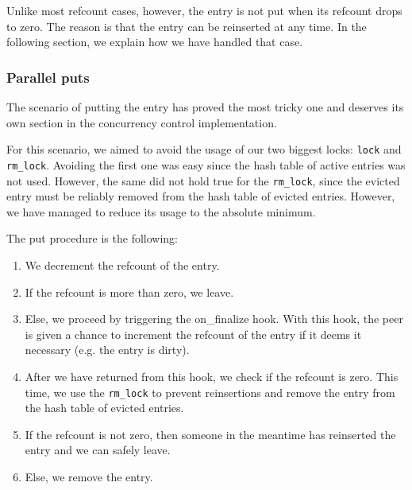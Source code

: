 \begin{comment}
\begin{table}
	\centering
	\begin{tabular}{ | l | l | }
		\hline
		Case & Refcount \\ \hline \hline
		active entry with pending jobs & ref > 1 \\ \hline
		active entry with no pending jobs & ref = 1 \\ \hline
		evicted entry with pending jobs & ref > 0 \\ \hline
		evicted entry with no pending jobs & ref = 0 \\ \hline
	\end{tabular}
	\caption{Reference counting of xcache}
	\label{tab:refcount}
\end{table}
\end{comment}

Unlike most refcount cases, however, the entry is not put when its refcount 
drops to zero. The reason is that the entry can be reinserted at any time. In 
the following section, we explain how we have handled that case.

\subsubsection{Parallel puts}

The scenario of putting the entry has proved the most tricky one and deserves 
its own section in the concurrency control implementation.

For this scenario, we aimed to avoid the usage of our two biggest locks: 
\texttt{lock} and \texttt{rm\_lock}. Avoiding the first one was easy since the 
hash table of active entries was not used. However, the same did not hold true 
for the \texttt{rm\_lock}, since the evicted entry must be reliably removed 
from the hash table of evicted entries. However, we have managed to reduce its 
usage to the absolute minimum.

The put procedure is the following:

\begin{enumerate}
	\item We decrement the refcount of the entry.
	\item If the refcount is more than zero, we leave.
	\item Else, we proceed by triggering the on\_finalize hook. With this 
		hook, the peer is given a chance to increment the refcount of 
		the entry if it deems it necessary (e.g. the entry is dirty).
	\item After we have returned from this hook, we check if the refcount 
		is zero.  This time, we use the \texttt{rm\_lock} to prevent 
		reinsertions and remove the entry from the hash table of 
		evicted entries.
	\item If the refcount is not zero, then someone in the meantime has 
		reinserted the entry and we can safely leave.
	\item Else, we remove the entry.
\end{enumerate}


